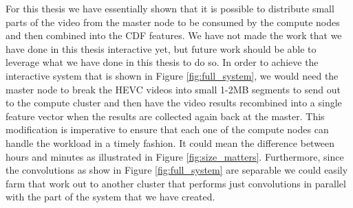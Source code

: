  \FloatBarrier

 For this thesis we have essentially shown that it is possible to distribute
 small parts of the video from the master node to be consumed by the compute nodes
 and then combined into the CDF features. We have not made the work that we have
 done in this thesis interactive yet, but future work should be able to leverage
 what we have done in this thesis to do so. In order to achieve the interactive
 system that is shown in Figure \ref{fig:full_system}, we would need the master
 node to break the HEVC videos into small 1-2MB segments to send out to the compute
 cluster and then have the video results recombined into a single feature vector
 when the results are collected again back at the master. This modification is
 imperative to ensure that each one of the compute nodes can handle the workload
 in a timely fashion. It could mean the difference between hours and minutes
 as illustrated in Figure \ref{fig:size_matters}. Furthermore, since the convolutions
 as show in Figure \ref{fig:full_system} are separable we could easily farm that
 work out to another cluster that performs just convolutions in parallel with
 the part of the system that we have created.
